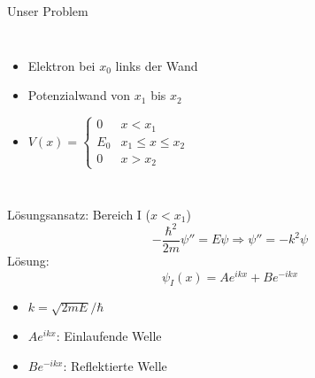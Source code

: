 \documentclass{beamer}
\begin{document}
    \begin{frame}{Unser Problem}
        \begin{columns}
            \begin{itemize}
                \item Elektron bei $x_0$ links der Wand
                \item Potenzialwand von $x_1$ bis $x_2$
                \item $V(x) = \begin{cases}
                                  0 & x < x_1 \\
                                  E_0 & x_1 \leq x \leq x_2 \\
                                  0 & x > x_2
                \end{cases}$
            \end{itemize}

        \end{columns}
    \end{frame}


    \begin{frame}{Lösungsansatz: Bereich I ($x < x_1$)}
        \[
            -\frac{\hbar^2}{2m}\psi'' = E\psi \Rightarrow \psi'' = -k^2\psi
        \]
        Lösung:
        \[
            \psi_I(x) = Ae^{ikx} + Be^{-ikx}
        \]
        \begin{itemize}
            \item $k = \sqrt{2mE}/\hbar$
            \item $Ae^{ikx}$: Einlaufende Welle
            \item $Be^{-ikx}$: Reflektierte Welle
        \end{itemize}
    \end{frame}
\end{document}
